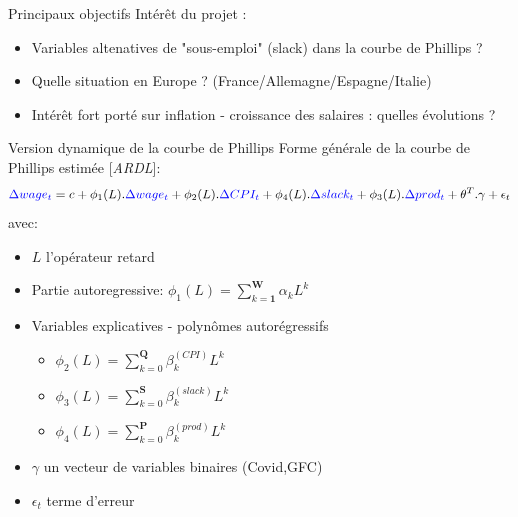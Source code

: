 \documentclass[9pt, xcolor={dvipsnames}]{beamer}
\newcommand{\blue}[1]{\textcolor{blue}{#1}}
\begin{document}
\begin{frame}{Principaux objectifs}
  Intérêt du projet :
  \begin{itemize}
    \item Variables altenatives de "sous-emploi" (slack) dans la courbe de Phillips ?
    \item Quelle situation en Europe ? (France/Allemagne/Espagne/Italie)
    \item Intérêt fort porté sur inflation - croissance des salaires : quelles évolutions ?
  \end{itemize}
\end{frame}

\begin{frame}[label=model]{Version dynamique de la courbe de Phillips}
  Forme générale de la courbe de Phillips estimée [\textit{ARDL}]:
  \begin{equation*}
    \blue{\Delta wage_{t}} = c + \phi_{1}(L).\blue{\Delta wage_{t}} + \phi_{2}(L).\blue{\Delta CPI_{t}} + \phi_{4}(L).\blue{\Delta slack_{t}} + \phi_{3}(L).\blue{\Delta prod_{t}} + \theta^{T}.\gamma + \epsilon_{t}
  \end{equation*}
  avec:
  \begin{itemize}
    \item $L$ l'opérateur retard
    \item Partie autoregressive: $\phi_{1}(L) = \sum_{k=\mathbf{1}}^{\mathbf{W}}\alpha_k L^{k}$ 
    \item Variables explicatives - polynômes autorégressifs
    \begin{itemize}
      \item $\phi_{2}(L) = \sum_{k=0}^{\mathbf{Q}}\beta_k^{(CPI)} L^{k}$
      \item $\phi_{3}(L) = \sum_{k=0}^{\mathbf{S}}\beta_k^{(slack)} L^{k}$
      \item $\phi_{4}(L) = \sum_{k=0}^{\mathbf{P}}\beta_k^{(prod)} L^{k}$
    \end{itemize}
    \item $\gamma$ un vecteur de variables binaires (Covid,GFC)
    \item $\epsilon_{t}$ terme d'erreur
  \end{itemize}
\end{frame}
\end{document}
